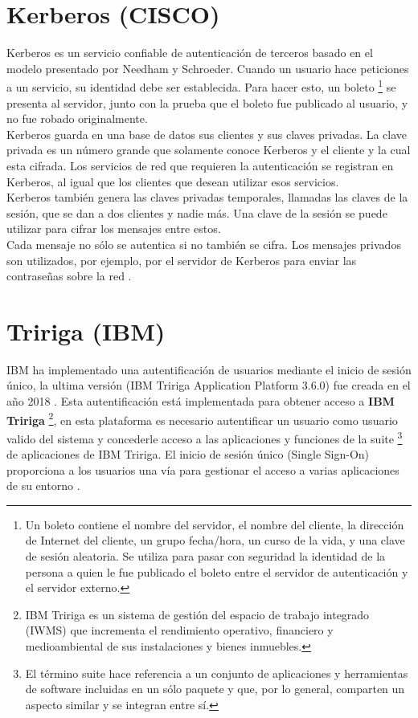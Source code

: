 \documentclass[12pt, a4paper, titlepage]{report}
\begin{document}
    \section{Kerberos (CISCO)}
    Kerberos es un servicio confiable de autenticación de terceros basado en el modelo presentado por Needham y Schroeder. Cuando un usuario hace peticiones a un servicio, su identidad debe ser establecida. Para hacer esto, un boleto \footnote{Un boleto contiene el nombre del servidor, el nombre del cliente, la dirección de Internet del cliente, un grupo fecha/hora, un curso de la vida, y una clave de sesión aleatoria. Se utiliza para pasar con seguridad la identidad de la persona a quien le fue publicado el boleto entre el servidor de autenticación y el servidor externo.} se presenta al servidor, junto con la prueba que el boleto fue publicado al usuario, y no fue robado originalmente. \\ Kerberos guarda en una base de datos sus clientes y sus claves privadas. La clave privada es un número grande que solamente conoce Kerberos y el cliente y la cual esta cifrada. Los servicios de red que requieren la autenticación se registran en Kerberos, al igual que los clientes que desean utilizar esos servicios.\\
    Kerberos también genera las claves privadas temporales, llamadas las claves de la sesión, que se dan a dos clientes y nadie más. Una clave de la sesión se puede utilizar para cifrar los mensajes entre estos.\\
    Cada mensaje no sólo se autentica si no también se cifra. Los mensajes privados son utilizados, por ejemplo, por el servidor de Kerberos para enviar las contraseñas sobre la red \cite{refKerberos}.\\
    
    \section{Tririga (IBM)}
    IBM ha implementado una autentificación de usuarios mediante el inicio de sesión único, la ultima versión (IBM Tririga Application Platform 3.6.0) fue creada en el año 2018 \cite{refIBMTRIRIGAYear}. Esta autentificación está implementada para obtener acceso a \textbf{IBM Tririga} \footnote{IBM Tririga es un sistema de gestión del espacio de trabajo integrado (IWMS) que incrementa el rendimiento operativo, financiero y medioambiental de sus instalaciones y bienes inmuebles.}, en esta plataforma es necesario autentificar un usuario como usuario valido del sistema y concederle acceso a las aplicaciones y funciones de la suite \footnote{El término suite hace referencia a un conjunto de aplicaciones y herramientas de software incluidas en un sólo paquete y que, por lo general, comparten un aspecto similar y se integran entre sí.} de aplicaciones de IBM Tririga. El inicio de sesión único (\Gls{Single Sign-On}) proporciona a los usuarios una vía para gestionar el acceso a varias aplicaciones de su entorno \cite{refIBMTRIRIGA}. \\
    
\end{document}
